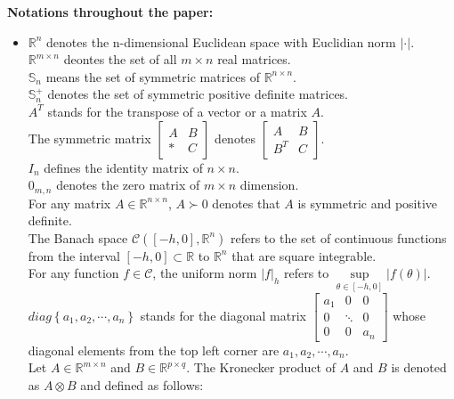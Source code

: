 \documentclass[a4paper]{cas-sc}
\begin{document}
\textbf{Notations throughout the paper:} 
\begin{itemize}
  \item[]
${\mathbb{R}^n}$ denotes the n-dimensional Euclidean space with Euclidian norm $| \cdot |$. \\
${\mathbb{R}^{m \times n}}$ deontes the set of all $m \times n$ real matrices. \\
$ {\mathbb{S}_n} $ means the set of symmetric matrices of ${\mathbb{R}^{n \times n}}$.\\
$\mathbb{S}_n^ + $ denotes the set of symmetric positive definite matrices.\\
${A^T} $ stands for the transpose of a vector or a matrix $A $.\\
The symmetric matrix $\left[ {\begin{array}{*{20}{c}}
  A & B \\
  * & C
\end{array}} \right]$ denotes $\left[ {\begin{array}{*{20}{c}}
  A       & B \\
  {{B^T}} & C
\end{array}} \right]$. \\
${I_n} $ defines the identity matrix of $ n \times n $.\\
${0_{m,n}} $ denotes the zero matrix of $ m \times n$ dimension. \\
For any matrix $A \in {\mathbb{R}^{n \times n}} $, $ A \succ 0$ denotes that $A $ is symmetric and positive definite.\\
The Banach space $\mathcal{C}\left( {\left[ { - h,0} \right],{\mathbb{R}^n}} \right)$ refers to the set of continuous functions from the interval $\left[ { - h,0} \right] \subset \mathbb{R}$ to ${\mathbb{R}^n}$ that are square integrable. \\
For any function $f \in \mathcal{C}$, the uniform norm $|f{|_h}$ refers to $\mathop {\sup }\limits_{\theta  \in [ - h,0]} |f(\theta )|$. \\
$diag\left\{ {{a_1},{a_2}, \cdots ,{a_n}} \right\}$ stands for the diagonal matrix $\left[ {\begin{array}{*{20}{c}}
  {{a_1}} & 0      & 0       \\
  0       & \ddots & 0       \\
  0       & 0      & {{a_n}}
\end{array}} \right]$ whose diagonal elements from the top left corner are ${a_1},{a_2}, \cdots ,{a_n}$.\\
Let $A \in {\mathbb{R}^{m \times n}}$ and $B \in {\mathbb{R}^{p \times q}}$. The Kronecker product of $A$ and $B$ is denoted as $A \otimes B$ and defined as follows:

\end{itemize}
\end{document}
